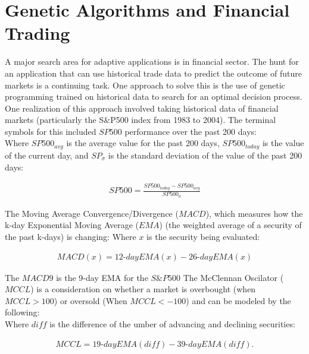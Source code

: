 \documentclass{article}
\renewcommand{\_}{\ifincsname_\else\legacyunderscore\fi}
\begin{document}
\section*{Genetic Algorithms and Financial Trading}
A major search area for adaptive applications is in financial sector. The hunt for an application that can use historical trade data to predict the outcome of future markets is a continuing task. One approach to solve this is the use of genetic programming trained on historical data to search for an optimal decision process. One realization of this approach involved taking historical data of financial markets (particularly the S\&P500 index from 1983 to 2004). The terminal symbols for this included \textbf{$SP500$} performance over the past 200 days:\\
Where $SP500_{avg}$ is the average value for the past 200 days, $SP500_{today}$ is the value of the current day, and $SP_\sigma$ is the standard deviation of the value of the past 200 days:

\begin{equation}
    \begin{aligned}
     SP500 = \frac{SP500_{today} - SP500_{avg}}{SP500_\sigma}
     \end{aligned}
\end{equation}

The Moving Average Convergence/Divergence (\textbf{$MACD$}), which measures how the k-day Exponential Moving Average ($EMA$) (the weighted average of a security of the past k-days) is changing:
Where $x$ is the security being evaluated:

\begin{equation}
    \begin{aligned}
     MACD(x) = 12\text{-}day EMA(x) - 26\text{-}day EMA(x)
     \end{aligned}
\end{equation}

The \textbf{$MACD9$} is the 9-day EMA for the $S\&P500$
The McClennan Oscilator ($MCCL$) is a consideration on whether a market is overbought (when $MCCL > 100$) or oversold (When $MCCL < -100$) and can be modeled by the following:\\
Where $diff$ is the difference of the  umber of advancing and declining securities:

\begin{equation}
    \begin{aligned}
    MCCL = 19\text{-}day EMA(diff) - 39\text{-}day EMA(diff).
    \end{aligned}
\end{equation}
\end{document}
